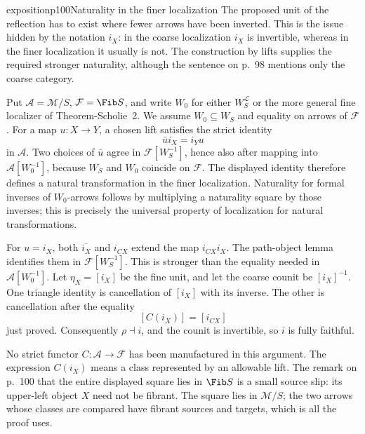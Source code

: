 \begin{dcomment}{exposition}{p100}{Naturality in the finer localization}
The proposed unit of the reflection has to exist where fewer arrows have been inverted. This is the issue hidden by the notation $i_X$: in the coarse localization $i_X$ is invertible, whereas in the finer localization it usually is not. The construction by lifts supplies the required stronger naturality, although the sentence on p.~98 mentions only the coarse category.

Put $\mathcal A=\mathcal M/S$, $\mathcal F=\Fib S$, and write $W_0$ for either $W_S^{\mathcal L}$ or the more general fine localizer of Theorem-Scholie~2. We assume $W_0\subseteq W_S$ and equality on arrows of $\mathcal F$. For a map $u:X\to Y$, a chosen lift satisfies the strict identity
\[
 \bar u i_X=i_Yu
\]
in $\mathcal A$. Two choices of $\bar u$ agree in $\mathcal F[W_S^{-1}]$, hence also after mapping into $\mathcal A[W_0^{-1}]$, because $W_S$ and $W_0$ coincide on $\mathcal F$. The displayed identity therefore defines a natural transformation in the finer localization. Naturality for formal inverses of $W_0$-arrows follows by multiplying a naturality square by those inverses; this is precisely the universal property of localization for natural transformations.

For $u=i_X$, both $\overline{i_X}$ and $i_{CX}$ extend the map $i_{CX}i_X$. The path-object lemma identifies them in $\mathcal F[W_S^{-1}]$. This is stronger than the equality needed in $\mathcal A[W_0^{-1}]$. Let $\eta_X=[i_X]$ be the fine unit, and let the coarse counit be $[i_X]^{-1}$. One triangle identity is cancellation of $[i_X]$ with its inverse. The other is cancellation after the equality
\[
 [C(i_X)]=[i_{CX}]
\]
just proved. Consequently $\rho\dashv i$, and the counit is invertible, so $i$ is fully faithful.

No strict functor $C:\mathcal A\to\mathcal F$ has been manufactured in this argument. The expression $C(i_X)$ means a class represented by an allowable lift. The remark on p.~100 that the entire displayed square lies in $\Fib S$ is a small source slip: its upper-left object $X$ need not be fibrant. The square lies in $\mathcal M/S$; the two arrows whose classes are compared have fibrant sources and targets, which is all the proof uses.
\end{dcomment}


